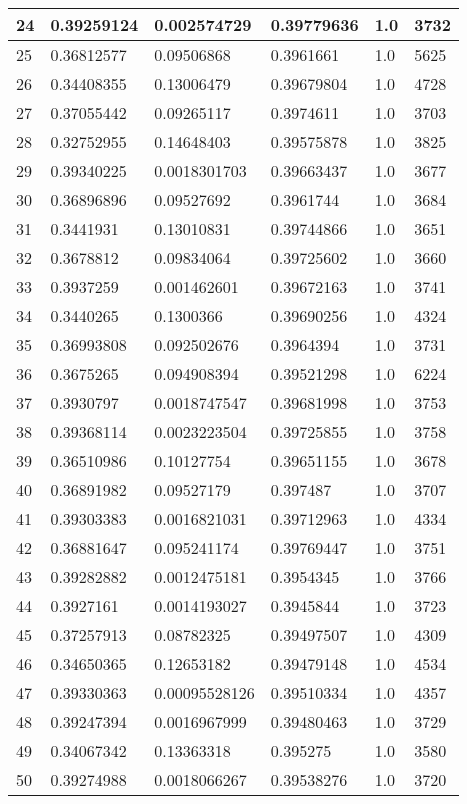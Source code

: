 \begin{longtable}{|l|l|l|l|l|l|}
24 & 0.39259124 & 0.002574729 & 0.39779636 & 1.0 & 3732 \\ \hline 
25 & 0.36812577 & 0.09506868 & 0.3961661 & 1.0 & 5625 \\ \hline 
26 & 0.34408355 & 0.13006479 & 0.39679804 & 1.0 & 4728 \\ \hline 
27 & 0.37055442 & 0.09265117 & 0.3974611 & 1.0 & 3703 \\ \hline 
28 & 0.32752955 & 0.14648403 & 0.39575878 & 1.0 & 3825 \\ \hline 
29 & 0.39340225 & 0.0018301703 & 0.39663437 & 1.0 & 3677 \\ \hline 
30 & 0.36896896 & 0.09527692 & 0.3961744 & 1.0 & 3684 \\ \hline 
31 & 0.3441931 & 0.13010831 & 0.39744866 & 1.0 & 3651 \\ \hline 
32 & 0.3678812 & 0.09834064 & 0.39725602 & 1.0 & 3660 \\ \hline 
33 & 0.3937259 & 0.001462601 & 0.39672163 & 1.0 & 3741 \\ \hline 
34 & 0.3440265 & 0.1300366 & 0.39690256 & 1.0 & 4324 \\ \hline 
35 & 0.36993808 & 0.092502676 & 0.3964394 & 1.0 & 3731 \\ \hline 
36 & 0.3675265 & 0.094908394 & 0.39521298 & 1.0 & 6224 \\ \hline 
37 & 0.3930797 & 0.0018747547 & 0.39681998 & 1.0 & 3753 \\ \hline 
38 & 0.39368114 & 0.0023223504 & 0.39725855 & 1.0 & 3758 \\ \hline 
39 & 0.36510986 & 0.10127754 & 0.39651155 & 1.0 & 3678 \\ \hline 
40 & 0.36891982 & 0.09527179 & 0.397487 & 1.0 & 3707 \\ \hline 
41 & 0.39303383 & 0.0016821031 & 0.39712963 & 1.0 & 4334 \\ \hline 
42 & 0.36881647 & 0.095241174 & 0.39769447 & 1.0 & 3751 \\ \hline 
43 & 0.39282882 & 0.0012475181 & 0.3954345 & 1.0 & 3766 \\ \hline 
44 & 0.3927161 & 0.0014193027 & 0.3945844 & 1.0 & 3723 \\ \hline 
45 & 0.37257913 & 0.08782325 & 0.39497507 & 1.0 & 4309 \\ \hline 
46 & 0.34650365 & 0.12653182 & 0.39479148 & 1.0 & 4534 \\ \hline 
47 & 0.39330363 & 0.00095528126 & 0.39510334 & 1.0 & 4357 \\ \hline 
48 & 0.39247394 & 0.0016967999 & 0.39480463 & 1.0 & 3729 \\ \hline 
49 & 0.34067342 & 0.13363318 & 0.395275 & 1.0 & 3580 \\ \hline 
50 & 0.39274988 & 0.0018066267 & 0.39538276 & 1.0 & 3720 \\ \hline 
\end{longtable}